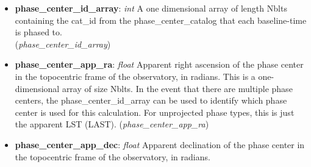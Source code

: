 \documentclass[11pt, oneside]{article}
\begin{document}
\begin{itemize}
\begin{itemize}
	  is proper motion (specified in the cat\_pm\_ra and cat\_pm\_dec keys).
	\item \textbf{cat\_times}: \textit{float}
	  Time in Julian Date for ephemeris points, a one dimensional array of
	  length Npts (the number of ephemeris data points).
	  Only used for ephem type phase centers.
	\item \textbf{cat\_pm\_ra}: \textit{float} (sidereal only)
	  Proper motion in RA in milliarcseconds per year for the source.
	\item \textbf{cat\_pm\_dec}: \textit{float} (sidereal only)
	  Proper motion in Dec in milliarcseconds per year for the source
	\item \textbf{cat\_dist}: \textit{float}
	  Distance to the source in parsec (useful if parallax is important), either a
	  single value or a one dimensional array of length Npts
	  (the number of ephemeris data points) for ephem type phase centers.
	\item \textbf{cat\_vrad}: \textit{float }
	  Radial velocity of the source in km/sec, either a single value or a
	  one dimensional array of length Npts (the number of ephemeris data points)
	  for ephem type phase centers.
	\item \textbf{info\_source}: \textit{string} Information about provenance of the source details.
	  Typically this is set either to ``file'' if it originates from a file read operation, and ``user'' if
	  it was added because of a call to the \verb+phase()+ method in \verb+pyuvdata+. But it
	  can also be set to contain more detailed information.
	\end{itemize} (\textit{phase\_center\_catalog})
\item \textbf{phase\_center\_id\_array}: \textit{int}
A one dimensional array of length Nblts containing the cat\_id from the phase\_center\_catalog
that each baseline-time is phased to. \\(\textit{phase\_center\_id\_array})
\item \textbf{phase\_center\_app\_ra}: \textit{float}
Apparent right ascension of the phase center in the topocentric frame of the observatory, in radians.
This is a one-dimensional array of size Nblts. In the event that there are multiple phase centers,
the phase\_center\_id\_array can be used to identify which phase center is used for this
calculation. For unprojected phase types, this is just the apparent LST (LAST). (\textit{phase\_center\_app\_ra})
\item \textbf{phase\_center\_app\_dec}: \textit{float}
Apparent declination of the phase center in the topocentric frame of the observatory, in radians.

\end{itemize}
\end{document}
